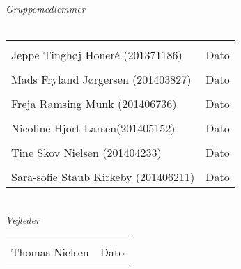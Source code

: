 \begin{vplace}[0.6]
{\large \textit{Gruppemedlemmer}}
\\
\\

\noindent \begin{tabular}{ll}
	\makebox[3.0in]{\hrulefill} & \makebox[1.5in]{\hrulefill}\\
	Jeppe Tinghøj Honeré (201371186) & Dato\\[8ex]%
	\makebox[3in]{\hrulefill} & \makebox[1.5in]{\hrulefill}\\
	Mads Fryland J\o rgersen (201403827) & Dato\\[8ex]
	\makebox[3in]{\hrulefill} & \makebox[1.5in]{\hrulefill}\\
	Freja Ramsing Munk (201406736) & Dato\\[8ex]
	\makebox[3in]{\hrulefill} & \makebox[1.5in]{\hrulefill}\\
	Nicoline Hjort Larsen(201405152) & Dato\\[8ex]
	\makebox[3in]{\hrulefill} & \makebox[1.5in]{\hrulefill}\\
	Tine Skov Nielsen (201404233) & Dato\\[8ex]
	\makebox[3in]{\hrulefill} & \makebox[1.5in]{\hrulefill}\\
	Sara-sofie Staub Kirkeby (201406211) & Dato\\[8ex]
	
\end{tabular}
\\
{\large \textit{Vejleder}}
\\[8ex]
\noindent \begin{tabular}{ll}
	\makebox[3.0in]{\hrulefill} & \makebox[1.5in]{\hrulefill}\\
	Thomas Nielsen & Dato\\[8ex]
\end{tabular}
\end{vplace}
